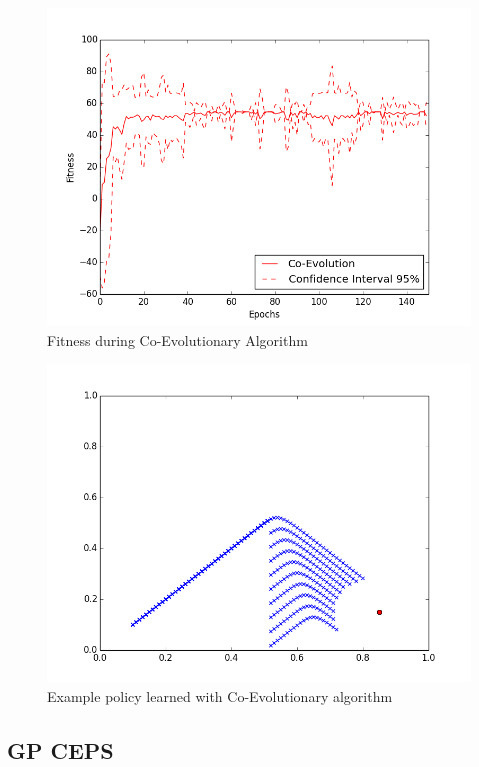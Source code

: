 \begin{figure}[ht]
  \centering
  \includegraphics[scale=0.5]{images/co_evo.png}
  \caption{Fitness during Co-Evolutionary Algorithm}\label{Fitness during Co-Evolutionary Algorithm}
\end{figure}

\begin{figure}[ht]
  \centering
  \includegraphics[scale=0.5]{images/co_evo_result.png}
  \caption{Example policy learned with Co-Evolutionary algorithm}\label{Example policy learned with Co-Evolutionary algorithm}
\end{figure}

\subsection{GP CEPS}

